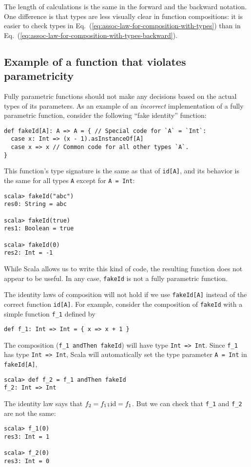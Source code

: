 The length of calculations is the same in the forward and the backward
notation. One difference is that types are less visually clear in
function compositions: it is easier to check types in Eq.~(\ref{eq:assoc-law-for-composition-with-types})
than in Eq.~(\ref{eq:assoc-law-for-composition-with-types-backward}).

\subsection{Example of a function that violates parametricity }

Fully parametric functions should not make any decisions based on
the actual types of its parameters. As an example of an \emph{incorrect}
implementation of a fully parametric function, consider the following
``fake identity'' function:
\begin{lstlisting}
def fakeId[A]: A => A = { // Special code for `A` = `Int`:
  case x: Int => (x - 1).asInstanceOf[A]
  case x => x // Common code for all other types `A`.
}
\end{lstlisting}
This function's type signature is the same as that of \lstinline!id[A]!,
and its behavior is the same for all types \lstinline!A! except for
\lstinline!A = Int!:
\begin{lstlisting}
scala> fakeId("abc")
res0: String = abc

scala> fakeId(true)
res1: Boolean = true

scala> fakeId(0)
res2: Int = -1
\end{lstlisting}
While Scala allows us to write this kind of code, the resulting function
does not appear to be useful. In any case, \lstinline!fakeId! is
not a fully parametric function.

The identity laws of composition will not hold if we use \lstinline!fakeId[A]!
instead of the correct function \lstinline!id[A]!. For example, consider
the composition of \lstinline!fakeId! with a simple function \lstinline!f_1!
defined by
\begin{lstlisting}
def f_1: Int => Int = { x => x + 1 }
\end{lstlisting}
The composition (\lstinline!f_1 andThen fakeId!) will have type \lstinline!Int => Int!.
Since \lstinline!f_1! has type \lstinline!Int => Int!, Scala will
automatically set the type parameter \lstinline!A = Int! in \lstinline!fakeId[A]!,
\begin{lstlisting}
scala> def f_2 = f_1 andThen fakeId
f_2: Int => Int
\end{lstlisting}
The identity law says that $f_{2}=f_{1}\bef\text{id}=f_{1}$. But
we can check that \lstinline!f_1! and \lstinline!f_2! are not the
same:
\begin{lstlisting}
scala> f_1(0)
res3: Int = 1

scala> f_2(0)
res3: Int = 0
\end{lstlisting}

